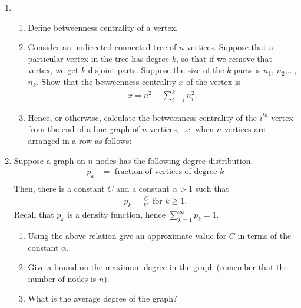 \documentclass[a4paper,10pt]{article}
\begin{document}
\begin{enumerate}
\begin{enumerate}
\end{enumerate}

\item 
\begin{enumerate}
\item Define betweenness centrality of a vertex. 
\item Consider an undirected connected tree of $n$ vertices. 
Suppose that a particular vertex in the tree has degree $k$, so that if we remove that vertex, we get $k$ disjoint parts.
Suppose the size of the $k$ parts is $n_1$, $n_2$,...,$n_k$. Show that the betweenness centrality $x$ of the vertex
is 
\begin{align*}
 x = n^2 - \sum_{i=1}^k n_i^2.
\end{align*}
\item Hence, or otherwise, calculate the betweenness centrality of the $i^{th}$ vertex from the end of a line-graph
of $n$ vertices, i.e. when $n$ vertices are arranged in a row as follows:
\vspace*{1.5in}
\end{enumerate}


\item Suppose a graph on $n$ nodes has the following degree distribution. 
\begin{align*}
 p_k &= \mbox{ fraction of vertices of degree } k\\
\end{align*}
Then, there is a constant $C$ and a constant $\alpha> 1$ such that
\begin{align*}
 p_k = \frac{C}{k^\alpha} \mbox{ for } k \ge 1.
\end{align*}
Recall that $p_k$ is a density function, hence $\sum_{k=1}^{\infty} p_k = 1$. 
\begin{enumerate}
\item Using the above relation give an approximate value for $C$ in terms of the constant $\alpha$.
\item Give a bound on the maximum degree in the graph (remember that the number of nodes is $n$).
\item What is the average degree of the graph?
\end{enumerate}


\end{enumerate}
\end{document}
